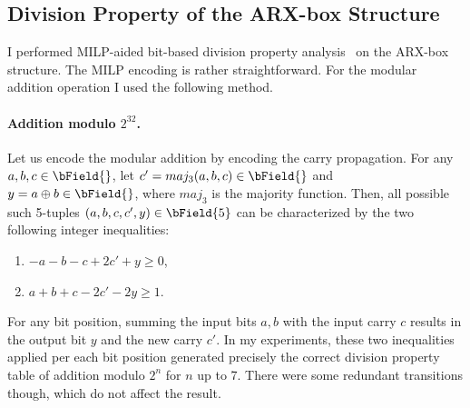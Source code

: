 
\subsection{Division Property of the ARX-box Structure}

I performed MILP-aided bit-based division property analysis~\cite{division,divisionbit} on the ARX-box structure. The MILP encoding is rather straightforward. For the modular addition operation I used the following method.

\paragraph{Addition modulo $2^{32}$.}
Let us encode the modular addition by encoding the carry propagation. For any $a,b,c \in \bField{}$, let $c' = maj_3(a,b,c) \in \bField{}$ and $y = a \oplus b \in \bField{}$, where $maj_3$ is the majority function. Then, all possible such 5-tuples $(a,b,c,c',y) \in \bField{5}$ can be characterized by the two following integer inequalities:
\begin{enumerate}
    \item $-a -b -c + 2c' + y \ge 0$,
    \item $a + b + c -2c' -2y \ge 1$.
\end{enumerate}
For any bit position, summing the input bits $a,b$ with the input carry $c$ results in the output bit $y$ and the new carry $c'$. 
In my experiments, these two inequalities applied per each bit position generated precisely the correct division property table of addition modulo $2^n$ for $n$ up to 7. There were some redundant transitions though, which do not affect the result.

